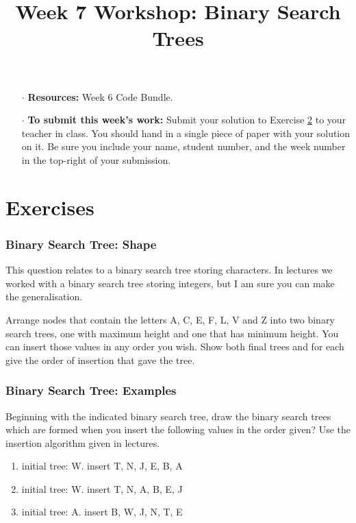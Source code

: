 \documentclass[twoside=false,DIV=14]{scrartcl}
\title{\color{redish} \vspace{-2em}Week 7 Workshop: Binary Search Trees}
\begin{document}
{\color{blackish}\maketitle}\vspace{-2em}%
\begin{itemize}
    \item[$\cdot$] {\bf Resources:}  Week 6  Code Bundle.
    \item[$\cdot$] {\bf To submit this week's work:} Submit your solution to Exercise \ref{sec:submission} to your teacher in class.  You should hand in a single piece of paper with your solution on it.  Be sure you include your name, student number, and the week number in the top-right of your submission.
\end{itemize}

\part*{Exercises}

\section{Binary Search Tree: Shape}
This question relates to a binary search tree storing characters.  In lectures we worked with a binary search tree storing integers, but I am sure you can make the generalisation.

Arrange nodes that contain the letters A, C, E, F, L,
V and Z into two binary search trees, one with maximum height and one
that has minimum height.  You can insert those values in any order you wish. Show both final trees and for each give the order of insertion that gave the tree.


\section{Binary Search Tree: Examples}
\label{sec:submission}
Beginning with the indicated binary search tree, draw the binary search trees which are formed when you insert the following values in the order given?  Use the insertion algorithm given in lectures.

\begin{enumerate}
\item  initial tree: W.  insert T, N, J, E, B, A
\item  initial tree: W.  insert T, N, A, B, E, J
\item  initial tree: A.  insert B, W, J, N, T, E
\end{enumerate}
\end{document}
